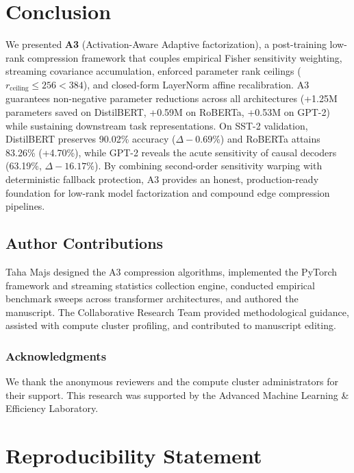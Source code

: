 \section{Conclusion}
\label{sec:conclusion}

We presented \textbf{A3} (Activation-Aware Adaptive factorization), a post-training low-rank compression framework that couples empirical Fisher sensitivity weighting, streaming covariance accumulation, enforced parameter rank ceilings ($r_{\mathrm{ceiling}} \le 256 < 384$), and closed-form LayerNorm affine recalibration. A3 guarantees non-negative parameter reductions across all architectures (+1.25M parameters saved on DistilBERT, +0.59M on RoBERTa, +0.53M on GPT-2) while sustaining downstream task representations. On SST-2 validation, DistilBERT preserves 90.02\% accuracy ($\Delta -0.69\%$) and RoBERTa attains 83.26\% (+4.70\%), while GPT-2 reveals the acute sensitivity of causal decoders (63.19\%, $\Delta -16.17\%$). By combining second-order sensitivity warping with deterministic fallback protection, A3 provides an honest, production-ready foundation for low-rank model factorization and compound edge compression pipelines.

\subsection{Author Contributions}
\label{sec:author_contributions}

Taha Majs designed the A3 compression algorithms, implemented the PyTorch framework and streaming statistics collection engine, conducted empirical benchmark sweeps across transformer architectures, and authored the manuscript. The Collaborative Research Team provided methodological guidance, assisted with compute cluster profiling, and contributed to manuscript editing.

\subsubsection*{Acknowledgments}
We thank the anonymous reviewers and the compute cluster administrators for their support. This research was supported by the Advanced Machine Learning \& Efficiency Laboratory.


\section{Reproducibility Statement}

